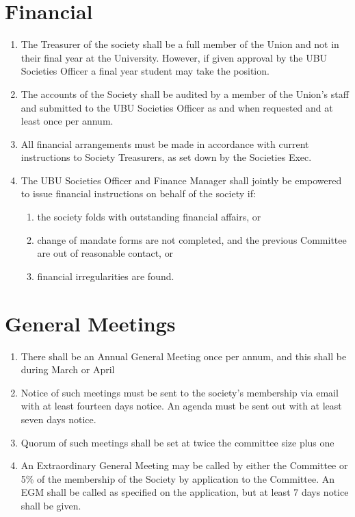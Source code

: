 \documentclass[a4paper,10pt]{article}
\begin{document}
\section{Financial}
\begin{enumerate}
  \item The Treasurer of the society shall be a full member of the Union and not in their final year at the University. However, if given approval by the UBU Societies Officer a final year student may take the position.
  \item The accounts of the Society shall be audited by a member of the Union’s staff and submitted to the UBU Societies Officer as and when requested and at least once per annum.
  \item All financial arrangements must be made in accordance with current instructions to Society Treasurers, as set down by the Societies Exec.
  \item The UBU Societies Officer and Finance Manager shall jointly be empowered to issue financial instructions on behalf of the society if:
  \begin{enumerate}
    \item the society folds with outstanding financial affairs, or
    \item change of mandate forms are not completed, and the previous Committee are out of reasonable contact, or
    \item financial irregularities are found.
  \end{enumerate}
\end{enumerate}

\section{General Meetings}
\begin{enumerate}
  \item There shall be an Annual General Meeting once per annum, and this shall be during March or April
  \item Notice of such meetings must be sent to the society’s membership via email with at least fourteen days notice. An agenda must be sent out with at least seven days notice.
  \item Quorum of such meetings shall be set at twice the committee size plus one
  \item An Extraordinary General Meeting may be called by either the Committee or 5\% of the membership of the Society by application to the Committee. An EGM shall be called as specified on the application, but at least 7 days notice shall be given.
\end{enumerate}
\end{document}
